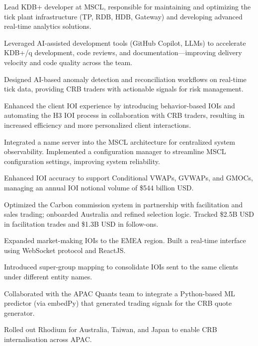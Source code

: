 \documentclass[]{deedy-resume-openfont}
\begin{document}
\begin{tightemize}
    \item Lead KDB+ developer at MSCL, responsible for maintaining and optimizing the tick plant infrastructure (TP, RDB, HDB, Gateway) and developing advanced real-time analytics solutions.
    \item Leveraged AI-assisted development tools (GitHub Copilot, LLMs) to accelerate KDB+/q development, code reviews, and documentation—improving delivery velocity and code quality across the team.
    \item Designed AI-based anomaly detection and reconciliation workflows on real-time tick data, providing CRB traders with actionable signals for risk management.
    \item Enhanced the client IOI experience by introducing behavior-based IOIs and automating the H3 IOI process in collaboration with CRB traders, resulting in increased efficiency and more personalized client interactions.
    \item Integrated a name server into the MSCL architecture for centralized system observability. Implemented a configuration manager to streamline MSCL configuration settings, improving system reliability.
\end{tightemize}
\sectionsep

\vspace{\topsep}

\begin{tightemize}
    \item Enhanced IOI accuracy to support Conditional VWAPs, GVWAPs, and GMOCs, managing an annual IOI notional volume of \$544 billion USD.
    \item Optimized the Carbon commission system in partnership with facilitation and sales trading; onboarded Australia and refined selection logic. Tracked \$2.5B USD in facilitation trades and \$1.3B USD in follow-ons.
    \item Expanded market-making IOIs to the EMEA region. Built a real-time interface using WebSocket protocol and ReactJS.
    \item Introduced super-group mapping to consolidate IOIs sent to the same clients under different entity names.
\end{tightemize}

\begin{tightemize}
    \item Collaborated with the APAC Quants team to integrate a Python-based ML predictor (via embedPy) that generated trading signals for the CRB quote generator.
    \item Rolled out Rhodium for Australia, Taiwan, and Japan to enable CRB internalisation across APAC.
\end{tightemize}
\end{document}
